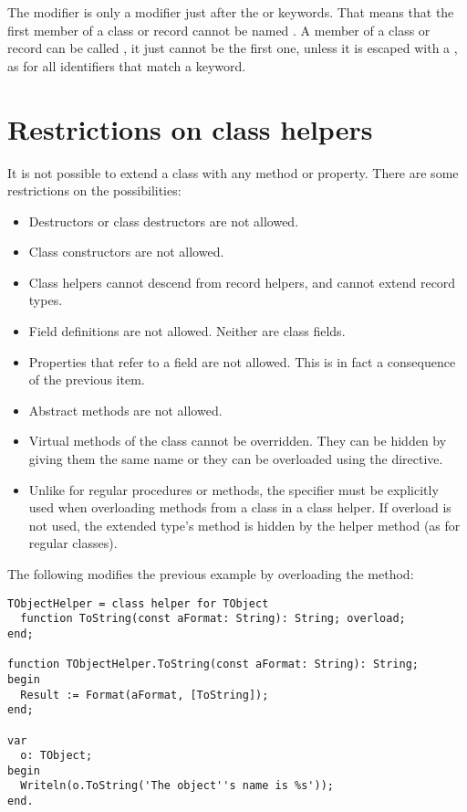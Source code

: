\begin{remark}
The  modifier is only a modifier just after the  or
 keywords. That means that the first member of a class or record
cannot be named . A member of a class or record can be called
, it just cannot be the first one, unless it is escaped with a
\var{\&}, as for all identifiers that match a keyword.
\end{remark}

\section{Restrictions on class helpers}
It is not possible to extend a class with any method or property. There are
some restrictions on the possibilities:
\begin{itemize}
\item Destructors or class destructors are not allowed.
\item Class constructors are not allowed. 
\item Class helpers cannot descend from record helpers, and cannot extend record types.
\item Field definitions are not allowed. Neither are class fields.
\item Properties that refer to a field are not allowed. This is in fact a
consequence of the previous item.
\item Abstract methods are not allowed.
\item Virtual methods of the class cannot be overridden. They can be hidden
by giving them the same name or they can be overloaded using the
 directive.
\item Unlike for regular procedures or methods, the  specifier must 
be explicitly used when overloading methods from a class in a class helper. 
If overload is not used, the extended type's method is hidden by the helper method
(as for regular classes).
\end{itemize}
The following modifies the previous example by overloading the 
method:
\begin{verbatim}
TObjectHelper = class helper for TObject
  function ToString(const aFormat: String): String; overload;
end;
 
function TObjectHelper.ToString(const aFormat: String): String;
begin
  Result := Format(aFormat, [ToString]);
end;
 
var
  o: TObject;
begin
  Writeln(o.ToString('The object''s name is %s'));
end.
\end{verbatim}

